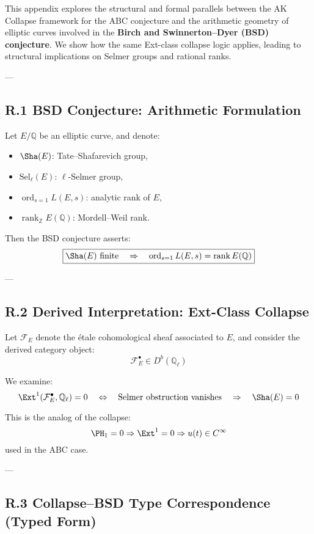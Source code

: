 \documentclass[11pt]{article}
\begin{document}
This appendix explores the structural and formal parallels between the AK Collapse framework for the ABC conjecture  
and the arithmetic geometry of elliptic curves involved in the \textbf{Birch and Swinnerton–Dyer (BSD) conjecture}.  
We show how the same Ext-class collapse logic applies, leading to structural implications on Selmer groups  
and rational ranks.

---

\subsection*{R.1 BSD Conjecture: Arithmetic Formulation}

Let \( E/\mathbb{Q} \) be an elliptic curve, and denote:
\begin{itemize}
  \item \( \Sha(E) \): Tate–Shafarevich group,
  \item \( \mathrm{Sel}_\ell(E) \): \( \ell \)-Selmer group,
  \item \( \operatorname{ord}_{s=1} L(E,s) \): analytic rank of \( E \),
  \item \( \operatorname{rank}_{\mathbb{Z}} E(\mathbb{Q}) \): Mordell–Weil rank.
\end{itemize}

Then the BSD conjecture asserts:
\[
\boxed{
\Sha(E) \text{ finite} \quad \Rightarrow \quad \operatorname{ord}_{s=1} L(E,s) = \operatorname{rank} E(\mathbb{Q})
}
\]

---

\subsection*{R.2 Derived Interpretation: Ext-Class Collapse}

Let \( \mathcal{F}_E \) denote the étale cohomological sheaf associated to \( E \), and consider the derived category object:
\[
\mathcal{F}_E^\bullet \in D^b(\mathbb{Q}_\ell)
\]

We examine:
\[
\Ext^1(\mathcal{F}_E^\bullet, \mathbb{Q}_\ell) = 0
\quad \Leftrightarrow \quad \text{Selmer obstruction vanishes} \quad \Rightarrow \quad \Sha(E) = 0
\]

This is the analog of the collapse:
\[
\PH_1 = 0 \Rightarrow \Ext^1 = 0 \Rightarrow u(t) \in C^\infty
\]
used in the ABC case.

---

\subsection*{R.3 Collapse–BSD Type Correspondence (Typed Form)}
\end{document}
